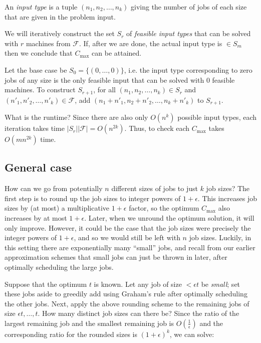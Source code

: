\documentclass{article}
\begin{document}
\begin{definition}
An {\em input type} is a tuple $(n_1, n_2, \ldots, n_k)$ giving the
number of jobs of each size that are given in the problem input.
\end{definition}

We will iteratively construct the set $S_r$ of {\em feasible input
types} that can be solved with $r$ machines from $\mathcal{F}$. If, after
we are done, the actual input type is $\in S_m$ then we conclude that
$C_{\textrm{max}}$ can be attained.

Let the base case be $S_0=\{(0,\ldots,0)\}$, i.e. the input type
corresponding to zero jobs of any size is the only feasible input that
can be solved with 0 feasible machines. To construct $S_{r+1}$, for
all $(n_1, n_2, \ldots, n_k) \in S_r$ and $(n'_1, n'_2, \ldots,
n'_k) \in \mathcal{F}$, add $(n_1+n'_1,n_2+n'_2, \ldots, n_k+n'_k)$
to $S_{r+1}$.

What is the runtime? Since there are also only $O(n^k)$ possible input
types, each iteration takes time $|S_r||\mathcal{F}| =
O(n^{2k})$. Thus, to check each $C_{\textrm{max}}$ takes $O(mn^{2k})$
time.


\subsection{General case}

How can we go from potentially $n$ different sizes of jobs to just $k$
job sizes? The first step is to round up the job sizes to integer
powers of $1+\epsilon$. This increases job sizes by (at most) a
multiplicative $1+\epsilon$ factor, so the optimum $C_{\textrm{max}}$
also increases by at most $1+\epsilon$. Later, when we unround the
optimum solution, it will only improve. However, it could be the case
that the job sizes were precisely the integer powers of $1+\epsilon$,
and so we would still be left with $n$ job sizes. Luckily, in this
setting there are exponentially many ``small'' jobs, and recall from
our earlier approximation schemes that small jobs can just be thrown
in later, after optimally scheduling the large jobs.


Suppose that the optimum $t$ is known. Let any job of size $<
\epsilon t$ be {\em small}; set these jobs aside to greedily add using
Graham's rule after optimally scheduling the other jobs. Next, apply
the above rounding scheme to the remaining jobs of size $\epsilon t,
\ldots, t$. How many distinct job sizes can there be? Since the ratio
of the largest remaining job and the smallest remaining job is
$O(\frac{1}{\epsilon})$ and the corresponding ratio for the rounded
sizes is $(1+\epsilon)^k$, we can solve:
\end{document}

